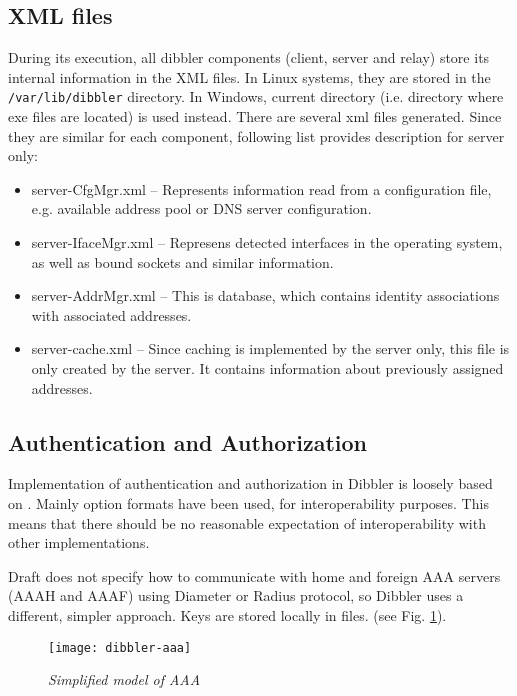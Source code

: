 \subsection{XML files}
\label{feature-xml}
During its execution, all dibbler components (client, server and
relay) store its internal information in the XML files. In Linux
systems, they are stored in the \verb+/var/lib/dibbler+ directory. In
Windows, current directory (i.e. directory where exe files are
located) is used instead. There are several xml files generated. Since
they are similar for each component, following list provides
description for server only:

\begin{itemize}
\item server-CfgMgr.xml -- Represents information read from a
  configuration file, e.g. available address pool or DNS server
      configuration.
\item server-IfaceMgr.xml -- Represens detected interfaces in the
  operating system, as well as bound sockets and similar information.
\item server-AddrMgr.xml -- This is database, which contains identity
  associations with associated addresses.
 \item server-cache.xml -- Since caching is implemented by the server
      only, this file is only created by the server. It contains
      information about previously assigned addresses.
\end{itemize}


\subsection{Authentication and Authorization}
\label{feature-auth}

Implementation of authentication and authorization in Dibbler is
loosely based on \cite{draft-aaa}. Mainly option formats have been
used, for interoperability purposes. This means that there should be
no reasonable expectation of interoperability with other
implementations.

Draft does not specify how to communicate with home and foreign AAA
servers (AAAH and AAAF) using Diameter or Radius protocol, so Dibbler
uses a different, simpler approach. Keys are stored locally in
files. (see Fig. \ref{fig-aaa}).

\begin{figure}[ht]
\begin{center}
\texttt{[image: dibbler-aaa]}
\caption{\emph{Simplified model of AAA}}
\label{fig-aaa}
\end{center}
\end{figure}

